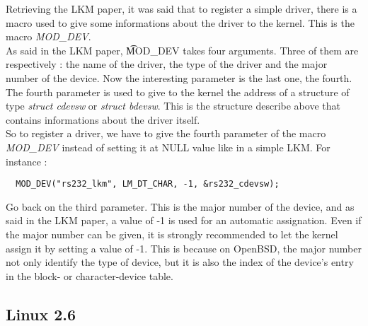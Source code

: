 \documentclass[11pt]{report}
\begin{document}
Retrieving the LKM paper, it was said that to register a simple driver, there is
a macro used to give some informations about the driver to the kernel. This is the
macro {\it MOD\_DEV}.\\
As said in the LKM paper, {\t MOD\_DEV} takes four arguments. Three of them are
respectively : the name of the driver, the type of the driver and the major number of
the device. Now the interesting parameter is the last one, the fourth.\\
The fourth parameter is used to give to the kernel the address of a structure of type
{\it struct cdevsw} or {\it struct bdevsw}. This is the structure describe above that
contains informations about the driver itself.\\
So to register a driver, we have to give the fourth parameter of the macro {\it
MOD\_DEV} instead of setting it at NULL value like in a simple LKM. For instance :
\begin{lstlisting}
  MOD_DEV("rs232_lkm", LM_DT_CHAR, -1, &rs232_cdevsw);
\end{lstlisting}
Go back on the third parameter. This is the major number of the device, and as said
in the LKM paper, a value of -1 is used for an automatic assignation. Even if the
major number can be given, it is strongly recommended to let the kernel assign it
by setting a value of -1. This is because on OpenBSD, the major number not only
identify the type of device, but it is also the index of the device's entry in the
block- or character-device table.

\subsection{Linux 2.6}
\end{document}
